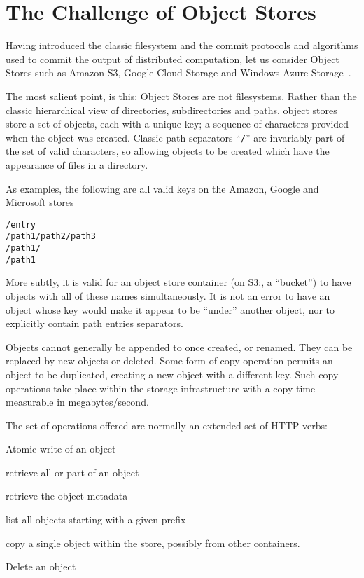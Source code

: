 \documentclass[conference]{IEEEtran}
\begin{document}
\section{The Challenge of Object Stores}
\label{sec:object-stores}

Having introduced the classic filesystem and the commit protocols and algorithms
used to commit the output of distributed computation, let us consider
Object Stores such as Amazon S3, Google Cloud Storage and
Windows Azure Storage\ \cite{AWS-S3-intro,Calder11}.



The most salient point, is this: Object Stores are not filesystems.
Rather than the classic hierarchical view of directories, subdirectories
and paths, object stores store a set of objects, each with a unique key;
a sequence of characters provided when the object was created.
Classic path separators ``\texttt{/}'' are invariably part of the set of valid
characters, so allowing objects to be created which have the appearance
of files in a directory.

As examples, the following are all valid keys on the Amazon, Google and Microsoft
stores

\begin{verbatim}
/entry
/path1/path2/path3
/path1/
/path1
\end{verbatim}

More subtly, it is valid for an object store container (on S3:, a ``bucket'')
to have objects with all of these names simultaneously.
It is not an error to have an object whose key would make it appear to be
``under'' another object, nor to explicitly contain path entries separators.

Objects cannot generally be appended to once created, or renamed.
They can be replaced by new objects or deleted.
Some form of copy operation permits an object to be duplicated, creating
a new object with a different key.
Such copy operations take place within the storage infrastructure with a
copy time measurable in megabytes/second.


The set of operations offered are normally an extended set of HTTP verbs:

\begin{description}[leftmargin=8em, style=nextline]
  \item[PUT] Atomic write of an object
  \item[GET] retrieve all or part of an object
  \item[HEAD] retrieve the object metadata
  \item[LIST] list all objects starting with a given prefix
  \item[COPY] copy a single object within the store, possibly from other containers.
  \item[DELETE] Delete an object
\end{description}
\end{document}
